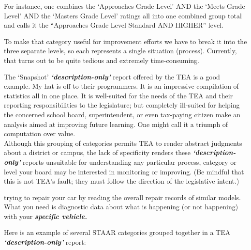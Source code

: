 \documentclass[
  letterpaper,
  DIV=11,
  numbers=noendperiod]{scrartcl}
\begin{document}
For instance, one combines the `Approaches Grade Level' AND the `Meets
Grade Level' AND the `Masters Grade Level' ratings all into one combined
group total and calls it the ``Approaches Grade Level Standard AND
HIGHER'' level.

To make that category useful for improvement efforts we have to break it
into the three separate levels, so each represents a single situation
(process). Currently, that turns out to be quite tedious and extremely
time-consuming.

The `Snapshot' \textbf{\emph{`description-only'}} report offered by the
TEA is a good example. My hat is off to their programmers. It is an
impressive compilation of statistics all in one place. It is well-suited
for the needs of the TEA and their reporting responsibilities to the
legislature; but completely ill-suited for helping the concerned school
board, superintendent, or even tax-paying citizen make an analysis aimed
at improving future learning. One might call it a triumph of computation
over value.\\

Although this grouping of categories permits TEA to render abstract
judgments about a district or campus, the lack of specificity renders
these \textbf{\emph{`description-only'}} reports unsuitable for
understanding any particular process, category or level your board may
be interested in monitoring or improving. (Be mindful that this is not
TEA's fault; they must follow the direction of the legislative intent.)

\begin{tcolorbox}[enhanced jigsaw, leftrule=.75mm, breakable, opacityback=0, toptitle=1mm, coltitle=black, opacitybacktitle=0.6, bottomrule=.15mm, colbacktitle=quarto-callout-tip-color!10!white, colframe=quarto-callout-tip-color-frame, arc=.35mm, bottomtitle=1mm, titlerule=0mm, title=\textcolor{quarto-callout-tip-color}{\faLightbulb}\hspace{0.5em}{{It's like\ldots{}}}, colback=white, rightrule=.15mm, left=2mm, toprule=.15mm]

{trying to repair your car by reading the overall repair records of
similar models. What you need is diagnostic data about what is happening
(or not happening) with your \textbf{\emph{specific vehicle.}}}

\end{tcolorbox}

\vspace{0.3in}

Here is an example of several STAAR categories grouped together in a TEA
\textbf{\emph{`description-only'}} report:
\end{document}

